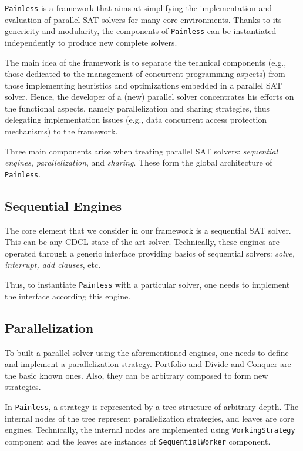 \documentclass[conference]{IEEEtran}
\newcommand{\painless}[0]{\texttt{Painless}\xspace}
\begin{document}
\painless is a framework that aims at simplifying the implementation and
evaluation of parallel SAT solvers for many-core environments. Thanks to its
genericity and modularity, the components of \painless can be instantiated
independently to produce new complete solvers.

The main idea of the framework is to separate the technical components (e.g.,
those dedicated to the management of concurrent programming aspects) from those
implementing heuristics and optimizations embedded in a parallel SAT solver.
Hence, the developer of a (new) parallel solver concentrates his efforts on the
functional aspects, namely parallelization and sharing strategies, thus
delegating implementation issues (e.g., data concurrent access protection
mechanisms) to the framework.

Three main components arise when treating parallel SAT solvers:
\textit{sequential engines}, \textit{parallelization}, and \textit{sharing}.
These form the global architecture of \painless.

\subsection{Sequential Engines}

The core element that we consider in our framework is a sequential SAT solver.
This can be any CDCL state-of-the art solver. Technically, these engines are
operated through a generic interface providing basics of sequential solvers:
\textit{solve, interrupt, add clauses}, etc.

Thus, to instantiate \painless with a particular solver, one needs to implement
the interface according this engine.  

\subsection{Parallelization}

To built a parallel solver using the aforementioned engines, one needs to
define and implement a parallelization strategy. Portfolio and
Divide-and-Conquer are the basic known ones. Also, they can be arbitrary
composed to form new strategies.

In \painless, a strategy is represented by a tree-structure of arbitrary depth.
The internal nodes of the tree represent parallelization strategies, and leaves
are core engines. Technically, the internal nodes are implemented using
\texttt{WorkingStrategy} component and the leaves are instances of
\texttt{SequentialWorker} component. 
\end{document}

